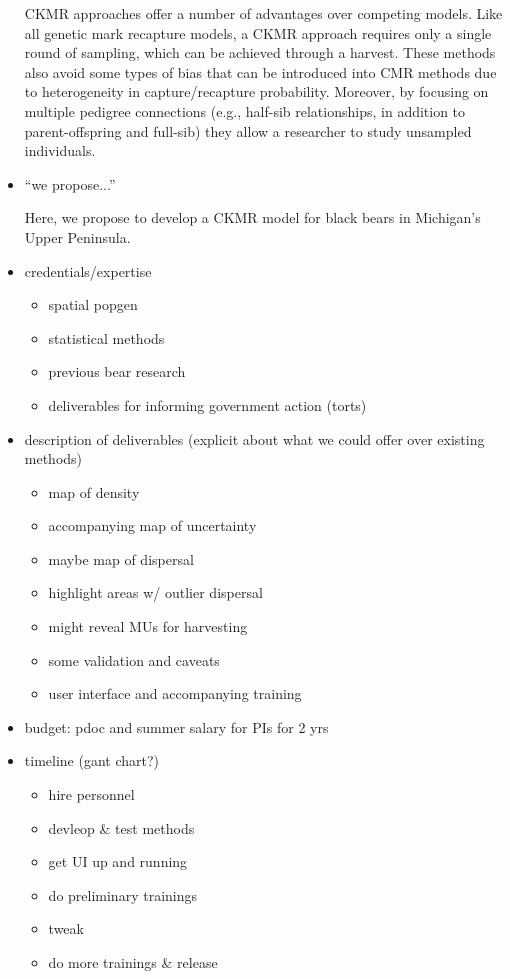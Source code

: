 \documentclass[12pt]{article}
\begin{document}
\begin{itemize}
CKMR approaches offer a number of advantages 
over competing models. 
Like all genetic mark recapture models, 
a CKMR approach requires only a single round of sampling, 
which can be achieved through a harvest.
These methods also avoid some types of bias 
that can be introduced into CMR methods due to 
heterogeneity in capture/recapture probability.
Moreover, by focusing on multiple pedigree connections 
(e.g., half-sib relationships, 
in addition to parent-offspring and full-sib) 
they allow a researcher to study unsampled individuals.

\item ``we propose...'' 

Here, we propose to develop a CKMR model 
for black bears in Michigan's Upper Peninsula.

\item credentials/expertise 
\begin{itemize}
\item spatial popgen
\item statistical methods
\item previous bear research
\item deliverables for informing government action (torts)
\end{itemize}
\item description of deliverables (explicit about what we could offer over existing methods)
\begin{itemize}
\item map of density
\item accompanying map of uncertainty
\item maybe map of dispersal
\item highlight areas w/ outlier dispersal
\item might reveal MUs for harvesting
\item some validation and caveats
\item user interface and accompanying training 
\end{itemize}
\item budget: pdoc and summer salary for PIs for 2 yrs
\item timeline (gant chart?)
\begin{itemize}
\item hire personnel
\item devleop \& test methods
\item get UI up and running
\item do preliminary trainings
\item tweak
\item do more trainings \& release
\end{itemize}
\end{itemize}

\clearpage
%
\end{document}
